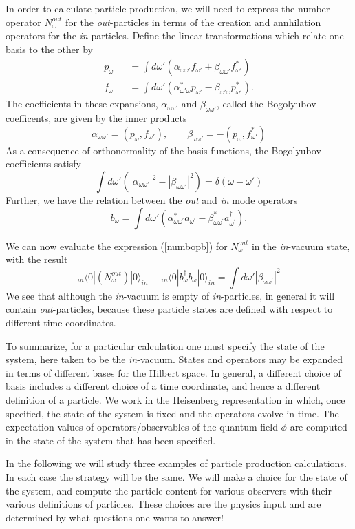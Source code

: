 \documentclass[12pt]{article}
\newcommand{\be}{\begin{equation}}
\newcommand{\ee}{\end{equation}}
\newcommand{\p}{\partial}
\def\bena{\begin{eqnarray}}
\def\eena{\end{eqnarray}}
\def\f{f_{\omega}}
\def\p{p_{\omega}}
\def\b{b_{\omega}}
\def\bd{b^{\dagger}_{\omega} }
\def\alp{\alpha _{\omega \omega '}}
\def\bet{\beta_{\omega\omega '}}
\begin{document}
In order to calculate particle production,
we will need to express the number operator $N_{\omega}^{out}$ for the {\it
out}-particles
in terms of the creation and annhilation operators for the {\it in}-particles.
Define the linear transformations which relate one basis to the other  by
%
\bena\label{bogone}
\p &&= \int d\omega ' ( \alp f_{\omega '} +\bet f_{\omega '}^* )\\
\f &&=  \int d\omega ' ( \alpha_{\omega ' \omega}^* p_{\omega '} -\beta_{\omega '
\omega} p_{\omega '}^* ).\eena
%
The coefficients in these expansions, $\alp$ and $\bet $, called the Bogolyubov
coefficents, are given by the inner products
\be\label{bogtwo}\alp =(\p ,f_{\omega '} ) ,\qquad \bet =-(\p , f_{\omega
'}^* ) \ee
%
As a consequence of orthonormality of the basis functions, the Bogolyubov
coefficients satisfy
%
\be\label{bognorm} \int d\omega ' (|\alp |^2 - |\bet |^2) =
\delta (\omega -\omega ')\ee
%
Further, we have the relation between the {\it out} and {\it in} mode operators
%
\be\label{bogthree} \b =\int d\omega '\left(
\alpha_{\omega\omega^\prime}^*a_{\omega^\prime}-
\beta^*_{\omega\omega^\prime}a^\dagger_{\omega^\prime}\right).\ee
%

We can now evaluate the expression (\ref{numbopb}) for $N_{\omega}^{out}$
in the {\it
in}-vacuum state, with the result
%
\be\label{outin}{}_{in}\langle0|  (N_\omega ^{out} )   |0\rangle_{in} \equiv
{}_{in}\langle0|\bd \b |0\rangle_{in} = \int d\omega ' | \beta  _{\omega \omega^\prime
} |^2 \ee
%
We see that although the {\it in}-vacuum is empty of {\it in}-particles, in
general
it will contain {\it out}-particles, because these particle states are defined
with respect to different time coordinates.

To summarize, for a particular calculation one must specify the state of
the system, here
taken to be the {\it in}-vacuum.
States and operators may be expanded in terms of different bases for the Hilbert
space. In general, a different choice of basis includes a different
choice of a time coordinate, and hence a different definition of a particle.
We work in the Heisenberg representation in which,
once specified, the state of the system is fixed and the operators evolve
in time. The
expectation values of operators/observables of the quantum field $\phi$ are
computed in the
state of the system that has been specified.

In the following we will study three examples of particle production
calculations. In each case the
strategy will be the same. We will make a choice for the state of the
system, and compute the
particle content for various observers with their various definitions of
particles.
These choices are the physics input and are determined by what questions
one wants to answer!
\end{document}
